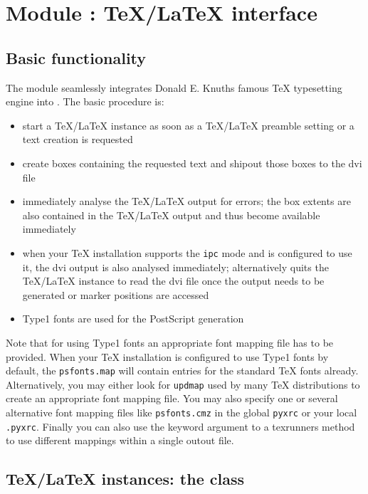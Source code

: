 \chapter{Module : \TeX/\LaTeX{} interface}
\label{module:text}

\section{Basic functionality}

The  module seamlessly integrates Donald E. Knuths famous
\TeX{} typesetting engine into \PyX. The basic procedure is:
\begin{itemize}
\item start a \TeX/\LaTeX{} instance as soon as a \TeX/\LaTeX{}
preamble setting or a text creation is requested
\item create boxes containing the requested text and shipout those
boxes to the dvi file
\item immediately analyse the \TeX/\LaTeX{} output for errors; the box
extents are also contained in the \TeX/\LaTeX{} output and thus become
available immediately
\item when your TeX installation supports the \texttt{ipc} mode and
\PyX{} is configured to use it, the dvi output is also analysed
immediately; alternatively \PyX{} quits the \TeX/\LaTeX{} instance to
read the dvi file once the output needs to be generated or marker
positions are accessed
\item Type1 fonts are used for the PostScript generation
\end{itemize}

Note that for using Type1 fonts an appropriate font mapping file has
to be provided. When your \TeX{} installation is configured to use
Type1 fonts by default, the \texttt{psfonts.map} will contain entries
for the standard \TeX{} fonts already. Alternatively, you may either
look for \texttt{updmap} used by many \TeX{} distributions to create
an appropriate font mapping file. You may also specify one or several
alternative font mapping files like \texttt{psfonts.cmz} in the global
\texttt{pyxrc} or your local \texttt{.pyxrc}. Finally you can also use
the  keyword argument to a texrunners 
method to use different mappings within a single outout file.

\section{\TeX/\LaTeX{} instances: the  class}

